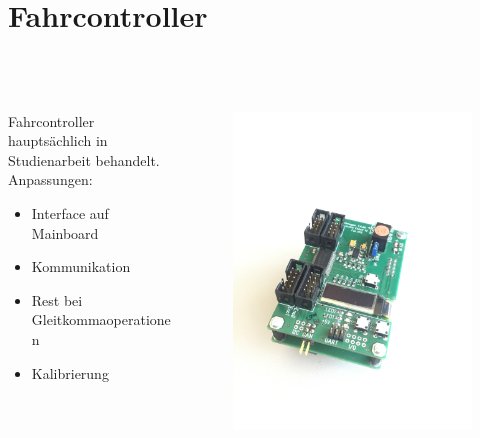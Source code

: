 \section{Fahrcontroller}

\begin{frame}
	\frametitle{\,}	
	\begin{columns}
		\begin{column}{0.6 \textwidth}
			Fahrcontroller hauptsächlich in Studienarbeit behandelt.
			\vspace{1.5em}
			Anpassungen:
			\begin{itemize}
				\item Interface auf Mainboard
				\item Kommunikation
				\item Rest bei Gleitkommaoperationen
				\item Kalibrierung
			\end{itemize}
		\end{column}
		\begin{column}{0.4 \textwidth}
			\vspace{-2.8em}
			\begin{figure}[h]
				\centering
				\includegraphics[width = 1 \textwidth]{../images/presentation/dc.jpg}
			\end{figure}
		\end{column}
	\end{columns}
	

\end{frame}

